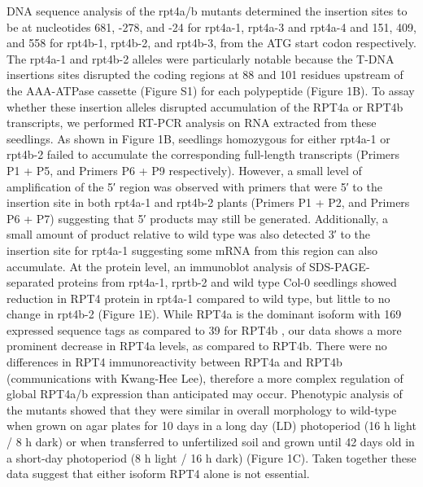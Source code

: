 DNA sequence analysis of the rpt4a/b mutants determined the insertion sites to be at nucleotides 681, -278, and -24 for rpt4a-1, rpt4a-3 and rpt4a-4 and 151, 409, and 558 for rpt4b-1, rpt4b-2, and rpt4b-3, from the ATG start codon respectively. The rpt4a-1 and rpt4b-2 alleles were particularly notable because the T-DNA insertions sites disrupted the coding regions at 88 and 101 residues upstream of the AAA-ATPase cassette (Figure S1) for each polypeptide (Figure 1B). To assay whether these insertion alleles disrupted accumulation of the RPT4a or RPT4b transcripts, we performed RT-PCR analysis on RNA extracted from these seedlings. As shown in Figure 1B, seedlings homozygous for either rpt4a-1 or rpt4b-2 failed to accumulate the corresponding full-length transcripts (Primers P1 + P5, and Primers P6 + P9 respectively). However, a small level of amplification of the 5′ region was observed with primers that were 5′ to the insertion site in both rpt4a-1 and rpt4b-2 plants (Primers P1 + P2, and Primers P6 + P7) suggesting that 5′ products may still be generated. Additionally, a small amount of product relative to wild type was also detected 3′ to the insertion site for rpt4a-1 suggesting some mRNA from this region can also accumulate. At the protein level, an immunoblot analysis of SDS-PAGE-separated proteins from rpt4a-1, rprtb-2 and wild type Col-0 seedlings showed reduction in RPT4 protein in rpt4a-1 compared to wild type, but little to no change in rpt4b-2 (Figure 1E). While RPT4a is the dominant isoform with 169 expressed sequence tags as compared to 39 for RPT4b , our data shows a more prominent decrease in RPT4a levels, as compared to RPT4b. There were no differences in RPT4 immunoreactivity between RPT4a and RPT4b (communications with Kwang-Hee Lee), therefore a more complex regulation of global RPT4a/b expression than anticipated may occur.  Phenotypic analysis of the mutants showed that they were similar in overall morphology to wild-type when grown on agar plates for 10 days in a long day (LD) photoperiod (16 h light / 8 h dark) or when transferred to unfertilized soil and grown until 42 days old in a short-day photoperiod (8 h light / 16 h dark) (Figure 1C).  Taken together these data suggest that either isoform RPT4 alone is not essential.

